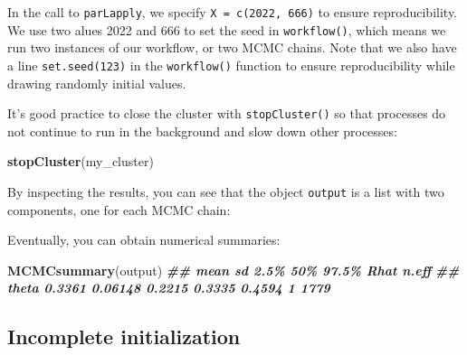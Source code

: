 \documentclass[
  12pt,
]{krantz}
\newenvironment{Shaded}{\begin{snugshade}}{\end{snugshade}}
\newcommand{\DocumentationTok}[1]{\textcolor[rgb]{0.56,0.35,0.01}{\textbf{\textit{#1}}}}
\newcommand{\FunctionTok}[1]{\textcolor[rgb]{0.13,0.29,0.53}{\textbf{#1}}}
\newcommand{\NormalTok}[1]{#1}
\begin{document}
In the call to \texttt{parLapply}, we specify \texttt{X\ =\ c(2022,\ 666)} to ensure reproducibility. We use two alues 2022 and 666 to set the seed in \texttt{workflow()}, which means we run two instances of our workflow, or two MCMC chains. Note that we also have a line \texttt{set.seed(123)} in the \texttt{workflow()} function to ensure reproducibility while drawing randomly initial values.

It's good practice to close the cluster with \texttt{stopCluster()} so that processes do not continue to run in the background and slow down other processes:

\begin{Shaded}
\begin{Highlighting}[]
\FunctionTok{stopCluster}\NormalTok{(my\_cluster)}
\end{Highlighting}
\end{Shaded}

By inspecting the results, you can see that the object \texttt{output} is a list with two components, one for each MCMC chain:

\begin{Shaded}
\end{Shaded}

Eventually, you can obtain numerical summaries:

\begin{Shaded}
\begin{Highlighting}[]
\FunctionTok{MCMCsummary}\NormalTok{(output)}
\DocumentationTok{\#\#         mean      sd   2.5\%    50\%  97.5\% Rhat n.eff}
\DocumentationTok{\#\# theta 0.3361 0.06148 0.2215 0.3335 0.4594    1  1779}
\end{Highlighting}
\end{Shaded}

\hypertarget{incomplete-initialization}{%
\subsection{Incomplete initialization}\label{incomplete-initialization}}
\end{document}
